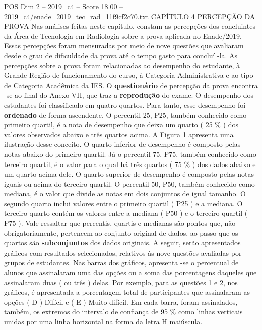 \begin{textsample}{POS Dim 2 – 2019\_c4 – Score 18.00 – 2019\_c4/enade\_2019\_tec\_rad\_11f9cf2c70.txt}  \label{ex:f2_pos_044}
CAPÍTULO 4 PERCEPÇÃO DA PROVA Nas análises feitas neste capítulo, constam as percepções dos concluintes da Área de Tecnologia em Radiologia sobre a prova aplicada no Enade/2019.
Essas percepções foram mensuradas por meio de nove questões que avaliaram desde o grau de dificuldade da prova até o tempo gasto para concluí -la.
As percepções sobre a prova foram relacionadas ao desempenho do estudante, à Grande Região de funcionamento do curso, à Categoria Administrativa e ao tipo de Categoria Acadêmica da IES.
O \textbf{questionário} de percepção da prova encontra -se ao final do Anexo VII, que traz a \textbf{reprodução} do exame.
O desempenho dos estudantes foi classificado em quatro quartos.
Para tanto, esse desempenho foi \textbf{ordenado} de forma ascendente.
O percentil 25, P25, também conhecido como primeiro quartil, é a nota de desempenho que deixa um quarto ( 25 \% ) dos valores observados abaixo e três quartos acima.
A Figura 1 apresenta uma ilustração desse conceito.
O quarto inferior de desempenho é composto pelas notas abaixo do primeiro quartil.
Já o percentil 75, P75, também conhecido como terceiro quartil, é o valor para o qual há três quartos ( 75 \% ) dos dados abaixo e um quarto acima dele.
O quarto superior de desempenho é composto pelas notas iguais ou acima do terceiro quartil.
O percentil 50, P50, também conhecido como mediana, é o valor que divide as notas em dois conjuntos de igual tamanho.
O segundo quarto inclui valores entre o primeiro quartil ( P25 ) e a mediana.
O terceiro quarto contém os valores entre a mediana ( P50 ) e o terceiro quartil ( P75 ).
Vale ressaltar que percentis, quartis e medianas são pontos que, não obrigatoriamente, pertencem ao conjunto original de dados, ao passo que os quartos são \textbf{subconjuntos} dos dados originais.
A seguir, serão apresentados gráficos com resultados selecionados, relativos às nove questões avaliadas por grupos de estudantes.
Nas barras dos gráficos, apresenta -se o percentual de alunos que assinalaram uma das opções ou a soma das porcentagens daqueles que assinalaram duas ( ou três ) delas.
Por exemplo, para as questões 1 e 2, nos gráficos, é apresentada a porcentagem total de participantes que assinalaram as opções ( D ) Difícil e ( E ) Muito difícil.
Em cada barra, foram assinalados, também, os extremos do intervalo de confiança de 95 \% como linhas verticais unidas por uma linha horizontal na forma da letra H maiúscula.

\end{textsample}
